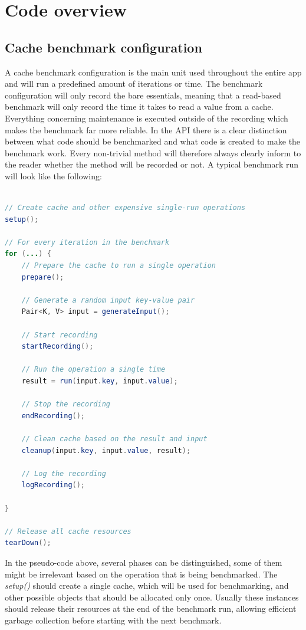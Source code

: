 \documentclass[pdftex,a4paper,12pt,twoside]{report}
\begin{document}
\section{Code overview}
\subsection{Cache benchmark configuration}
A cache benchmark configuration is the main unit used throughout the entire app and will run a predefined amount of iterations or time. The benchmark configuration will only record the bare essentials, meaning that a read-based benchmark will only record the time it takes to read a value from a cache. Everything concerning maintenance is executed outside of the recording which makes the benchmark far more reliable. In the API there is a clear distinction between what code should be benchmarked and what code is created to make the benchmark work. Every non-trivial method will therefore always clearly inform to the reader whether the method will be recorded or not. A typical benchmark run will look like the following:
\\\\
\begin{lstlisting}[language=java]
// Create cache and other expensive single-run operations
setup();

// For every iteration in the benchmark
for (...) {
	// Prepare the cache to run a single operation
	prepare();
	
	// Generate a random input key-value pair
	Pair<K, V> input = generateInput();
	
	// Start recording
	startRecording();
	
	// Run the operation a single time
	result = run(input.key, input.value);
	
	// Stop the recording
	endRecording();
	
	// Clean cache based on the result and input
	cleanup(input.key, input.value, result);
	
	// Log the recording
	logRecording();
	
}

// Release all cache resources
tearDown();
\end{lstlisting}
In the pseudo-code above, several phases can be distinguished, some of them might be irrelevant based on the operation that is being benchmarked. The \emph{setup()} should create a single cache, which will be used for benchmarking, and other possible objects that should be allocated only once. Usually these instances should release their resources at the end of the benchmark run, allowing efficient garbage collection before starting with the next benchmark.
\end{document}
